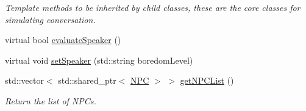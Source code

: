 \begin{DoxyCompactItemize}
\begin{DoxyCompactList}\small\item\em Template methods to be inherited by child classes, these are the core classes for simulating conversation. \end{DoxyCompactList}\item 
virtual bool \hyperlink{class_base___group_a8264ff598ce7e789c6419e2e6eef08fd}{evaluate\+Speaker} ()
\item 
virtual void \hyperlink{class_base___group_ae35b3719076cf40d6577b4ae3779758c}{set\+Speaker} (std\+::string boredom\+Level)
\item 
std\+::vector$<$ std\+::shared\+\_\+ptr$<$ \hyperlink{class_n_p_c}{N\+PC} $>$ $>$ \hyperlink{class_base___group_a75eec9132aaf532b4429e0af76b31775}{get\+N\+P\+C\+List} ()
\begin{DoxyCompactList}\small\item\em Return the list of N\+P\+Cs. \end{DoxyCompactList}\end{DoxyCompactItemize}
